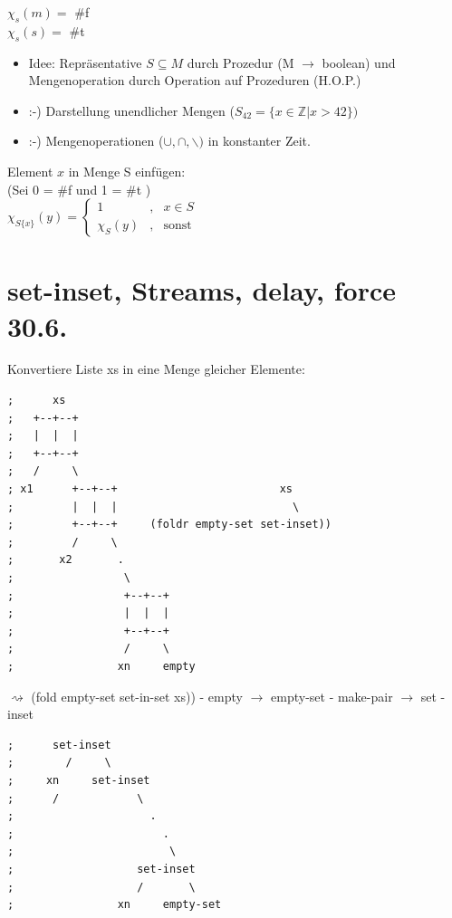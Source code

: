 \documentclass[a4paper, 20pt, openany]{book}
\begin{document}
$\chi_s(m) = $ \#f\\
$\chi_s(s) = $ \#t
\begin{itemize}
\item Idee: Repräsentative $S \subseteq M$ durch Prozedur (M $\rightarrow$ boolean) und Mengenoperation durch Operation auf Prozeduren (H.O.P.)
\item :-) Darstellung unendlicher Mengen ($S_{42} = \lbrace x \in \mathbb{Z} | x > 42 \rbrace)$
\item :-) Mengenoperationen ($\cup , \cap , \backslash )$ in konstanter Zeit.
\end{itemize}

Element $x$ in Menge S einfügen:\\
(Sei 0 = \#f und 1 = \#t )\\
$\chi_{S \lbrace x \rbrace}(y) =\left\{\begin{array}{rcl}1 &,& x\in S\\\chi_{S} (y)  &,& \mathrm{sonst}\end{array}\right.$


\chapter{set-inset, Streams, delay, force 30.6.}
Konvertiere Liste xs in eine Menge gleicher Elemente:
\begin{lstlisting}
;      xs
;   +--+--+                             
;   |  |  |                             
;   +--+--+                         
;   /     \                                
; x1      +--+--+                         xs
;         |  |  |                           \ 
;         +--+--+     (foldr empty-set set-inset))
;         /     \                                
;       x2       .                             
;                 \                             
;                 +--+--+                     
;                 |  |  |                         
;                 +--+--+                           
;                 /     \          
;                xn     empty  
\end{lstlisting}

$\rightsquigarrow$ (fold empty-set set-in-set xs))
- empty $\rightarrow$ empty-set
- make-pair $\rightarrow$ set -inset

\begin{lstlisting}
;      set-inset                    
;        /     \                                
;     xn     set-inset                        
;      /            \          
;                     .
;                       .
;                        \
;                   set-inset
;                   /       \
;                xn     empty-set
\end{lstlisting}
\end{document}

